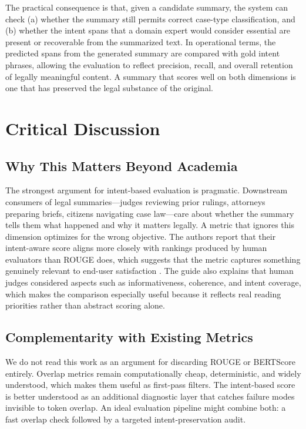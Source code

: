 \documentclass[conference]{IEEEtran}
\begin{document}
The practical consequence is that, given a candidate summary, the system can check (a) whether the summary still permits correct case-type classification, and (b) whether the intent spans that a domain expert would consider essential are present or recoverable from the summarized text. In operational terms, the predicted spans from the generated summary are compared with gold intent phrases, allowing the evaluation to reflect precision, recall, and overall retention of legally meaningful content. A summary that scores well on both dimensions is one that has preserved the legal substance of the original.

\section{Critical Discussion}

\subsection{Why This Matters Beyond Academia}
The strongest argument for intent-based evaluation is pragmatic. Downstream consumers of legal summaries---judges reviewing prior rulings, attorneys preparing briefs, citizens navigating case law---care about whether the summary tells them what happened and why it matters legally. A metric that ignores this dimension optimizes for the wrong objective. The authors report that their intent-aware score aligns more closely with rankings produced by human evaluators than ROUGE does, which suggests that the metric captures something genuinely relevant to end-user satisfaction \cite{mullick2022}. The guide also explains that human judges considered aspects such as informativeness, coherence, and intent coverage, which makes the comparison especially useful because it reflects real reading priorities rather than abstract scoring alone.

\subsection{Complementarity with Existing Metrics}
We do not read this work as an argument for discarding ROUGE or BERTScore entirely. Overlap metrics remain computationally cheap, deterministic, and widely understood, which makes them useful as first-pass filters. The intent-based score is better understood as an additional diagnostic layer that catches failure modes invisible to token overlap. An ideal evaluation pipeline might combine both: a fast overlap check followed by a targeted intent-preservation audit.
\end{document}
